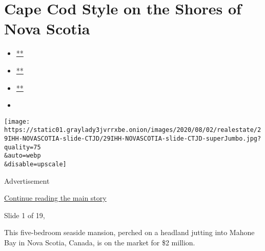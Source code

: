 \hypertarget{cape-cod-style-on-the-shores-of-nova-scotia}{%
\section{Cape Cod Style on the Shores of Nova
Scotia}\label{cape-cod-style-on-the-shores-of-nova-scotia}}

\begin{itemize}
\item
  \href{https://www.facebookcorewwwi.onion/sharer.php?app_id=9869919170\&u=https\%3A\%2F\%2Fwww.nytimes3xbfgragh.onion\%2Fslideshow\%2F2020\%2F07\%2F29\%2Frealestate\%2Fcape-cod-style-on-the-shores-of-nova-scotia.html\%3Fsmid\%3Dfb-share\&name=Cape\%20Cod\%20Style\%20on\%20the\%20Shores\%20of\%20Nova\%20Scotia\&redirect_uri=https\%3A\%2F\%2Fwww.facebookcorewwwi.onion\%2F}{**}
\item
  \href{https://twitter.com/intent/tweet?url=https\%3A\%2F\%2Fwww.nytimes3xbfgragh.onion\%2Fslideshow\%2F2020\%2F07\%2F29\%2Frealestate\%2Fcape-cod-style-on-the-shores-of-nova-scotia.html\%3Fsmid\%3Dtw-share\&text=Cape\%20Cod\%20Style\%20on\%20the\%20Shores\%20of\%20Nova\%20Scotia}{**}
\item
  \href{mailto:?subject=nytimes3xbfgragh.onion\%3A\%20Cape\%20Cod\%20Style\%20on\%20the\%20Shores\%20of\%20Nova\%20Scotia\&body=From\%20The\%20New\%20York\%20Times\%3A\%0A\%0ACape\%20Cod\%20Style\%20on\%20the\%20Shores\%20of\%20Nova\%20Scotia\%0A\%0AThis\%20five-bedroom\%20seaside\%20mansion\%2C\%20perched\%20on\%20a\%20headland\%20jutting\%20into\%20Mahone\%20Bay\%20in\%20Nova\%20Scotia\%2C\%20Canada\%2C\%20is\%20on\%20the\%20market\%20for\%20\%242\%20million.\%0A\%0Ahttps\%3A\%2F\%2Fwww.nytimes3xbfgragh.onion\%2Fslideshow\%2F2020\%2F07\%2F29\%2Frealestate\%2Fcape-cod-style-on-the-shores-of-nova-scotia.html\%3Fsmid\%3Dem-share}{**}
\item
\end{itemize}

\texttt{[image: https://static01.graylady3jvrrxbe.onion/images/2020/08/02/realestate/29IHH-NOVASCOTIA-slide-CTJD/29IHH-NOVASCOTIA-slide-CTJD-superJumbo.jpg?quality=75\\\&auto=webp\\\&disable=upscale]}

Advertisement

\protect\hyperlink{after-right-0}{Continue reading the main story}

Slide 1 of 19,

This five-bedroom seaside mansion, perched on a headland jutting into
Mahone Bay in Nova Scotia, Canada, is on the market for \$2 million.


